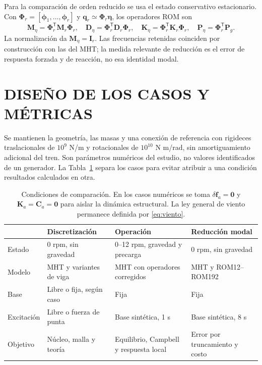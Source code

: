 \documentclass[oneside,a4paper,spanish,links,pagenumbers]{amca}
\newcommand{\I}{\bm I}
\newcommand{\tr}{\mathsf T}
\begin{document}
Para la comparación de orden reducido se usa el estado conservativo estacionario. Con $\bm\Phi_r=[\bm\phi_1,\ldots,\bm\phi_r]$ y $\bm q_r\simeq\bm\Phi_r\bm\eta$, los operadores ROM son
\begin{equation}
 \bm M_\eta=\bm\Phi_r^\tr\bm M_r\bm\Phi_r,\quad
 \bm D_\eta=\bm\Phi_r^\tr\bm D_r\bm\Phi_r,\quad
 \bm K_\eta=\bm\Phi_r^\tr\bm K_r\bm\Phi_r,\quad
 \bm P_\eta=\bm\Phi_r^\tr\bm P_g.
 \label{eq:rom}
\end{equation}
La normalización da $\bm M_\eta=\I_r$. Las frecuencias retenidas coinciden por construcción con las del MHT; la medida relevante de reducción es el error de respuesta forzada y de reacción, no esa identidad modal.

\section{DISEÑO DE LOS CASOS Y MÉTRICAS}
\label{sec:casos}
Se mantienen la geometría, las masas y una conexión de referencia con rigideces traslacionales de $10^9$ N/m y rotacionales de $10^{10}$ N m/rad, sin amortiguamiento adicional del tren. Son parámetros numéricos del estudio, no valores identificados de un generador. La Tabla~\ref{tab:campanas} separa los casos para evitar atribuir a una condición resultados calculados en otra.

\begin{table}[htbp]\centering\small
\begin{tabularx}{\textwidth}{lXXX}\toprule
 & Discretización & Operación & Reducción modal\\\midrule
Estado &0 rpm, sin gravedad &0--12 rpm, gravedad y precarga &0 rpm, sin gravedad\\
Modelo &MHT y variantes de viga &MHT con operadores corregidos &MHT y ROM12--ROM192\\
Base &Libre o fija, según caso &Fija &Fija\\
Excitación &Libre o fuerza de punta &Base sintética, 1 s &Base sintética, 8 s\\
Objetivo &Núcleo, malla y teoría &Equilibrio, Campbell y respuesta local &Error por truncamiento y costo\\\bottomrule
\end{tabularx}
\caption{Condiciones de comparación. En los casos numéricos se toma $\delta\bm f_a=\bm0$ y $\bm K_a=\bm C_a=\bm0$ para aislar la dinámica estructural. La ley general de viento permanece definida por \eqref{eq:viento}.}\label{tab:campanas}
\end{table}
\end{document}
